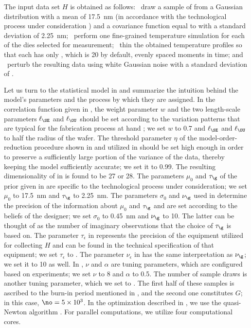 The input data set $H$ is obtained as follows: \one~draw a sample of \g from a
Gaussian distribution with a mean of 17.5~nm (in accordance with the
technological process under consideration \cite{ptm}) and a covariance function
equal to  with a standard deviation of 2.25~nm;
\two~perform one fine-grained temperature simulation for each of the \hnd dies
selected for measurement; \three~thin the obtained temperature profiles so that
each has only \ns, which is 20 by default, evenly spaced moments in time; and
\four~perturb the resulting data using white Gaussian noise with a standard
deviation of .

Let us turn to the statistical model in  and
summarize the intuition behind the model's parameters and the process by which
they are assigned. In the correlation function given in
, the weight parameter $w$ and the two length-scale
parameters $\ell_\SE$ and $\ell_\OU$ should be set according to the variation
patterns that are typical for the fabrication process at hand
\cite{chandrakasan2000, cheng2011}; we set $w$ to 0.7 and $\ell_\SE$ and
$\ell_\OU$ to half the radius of the wafer. The threshold parameter $\eta$ of
the model-order-reduction procedure shown in  and utilized
in  should be set high enough in order to preserve a
sufficiently large portion of the variance of the data, thereby keeping the
model sufficiently accurate; we set it to 0.99. The resulting dimensionality \nz
of \vz in  is found to be 27 or 28. The parameters $\mu_0$
and $\tau_\g$ of the prior given in  are specific to the
technological process under consideration; we set $\mu_0$ to 17.5~nm and
$\tau_\g$ to 2.25~nm. The parameters $\sigma_0$ and $\nu_\g$ used in
 determine the precision of the information about $\mu_0$ and
$\tau_\g$ and are set according to the beliefs of the designer; we set
$\sigma_0$ to 0.45~nm and $\nu_\g$ to 10. The latter can be thought of as the
number of imaginary observations that the choice of $\tau_\g$ is based on. The
parameter $\tau_\epsilon$ in  represents the precision of the
equipment utilized for collecting $H$ and can be found in the technical
specification of that equipment; we set $\tau_\epsilon$ to . The
parameter $\nu_\epsilon$ in  has the same interpretation as
$\nu_\g$; we set it to 10 as well. In , $\nu$ and $\alpha$
are tuning parameters, which are configured based on experiments; we set $\nu$
to 8 and $\alpha$ to 0.5. The number of sample draws is another tuning
parameter, which we set to . The first half of these samples is
ascribed to the burn-in period mentioned in , and the
second one constitutes $G$; in this case, $\no = 5 \times 10^3$. In the
optimization described in , we use the quasi-Newton
algorithm \cite{press2007}. For parallel computations, we utilize four
computational cores.

